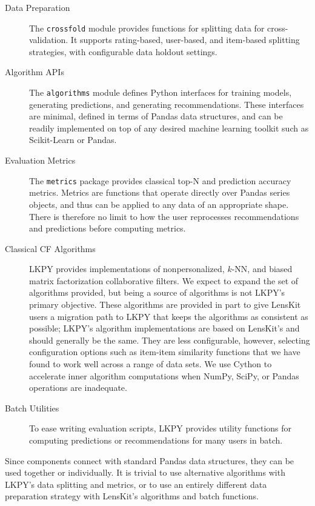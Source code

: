 \begin{description}
\item[Data Preparation]
The \texttt{crossfold} module provides functions for splitting data for cross-validation.
It supports rating-based, user-based, and item-based splitting strategies, with configurable data holdout settings.

\item[Algorithm APIs]
The \texttt{algorithms} module defines Python interfaces for training models, generating predictions, and generating recommendations.
These interfaces are minimal, defined in terms of Pandas data structures, and can be readily implemented on top of any desired machine learning toolkit such as Scikit-Learn or Pandas.

\item[Evaluation Metrics]
The \texttt{metrics} package provides classical top-N and prediction accuracy metrics.
Metrics are functions that operate directly over Pandas series objects, and thus can be applied to any data of an appropriate shape.
There is therefore no limit to how the user reprocesses recommendations and predictions before computing metrics.

\item[Classical CF Algorithms]
LKPY provides implementations of nonpersonalized, $k$-NN, and biased matrix factorization collaborative filters.
We expect to expand the set of algorithms provided, but being a source of algorithms is not LKPY's primary objective.
These algorithms are provided in part to give LensKit users a migration path to LKPY that keeps the algorithms as consistent as possible; LKPY's algorithm implementations are based on LensKit's and should generally be the same.
They are less configurable, however, selecting configuration options such as item-item similarity functions that we have found to work well across a range of data sets.
We use Cython to accelerate inner algorithm computations when NumPy, SciPy, or Pandas operations are inadequate.

\item[Batch Utilities]
To ease writing evaluation scripts, LKPY provides utility functions for computing predictions or recommendations for many users in batch.
\end{description}

Since components connect with standard Pandas data structures, they can be used together or individually.
It is trivial to use alternative algorithms with LKPY's data splitting and metrics, or to use an entirely different data preparation strategy with LensKit's algorithms and batch functions.

